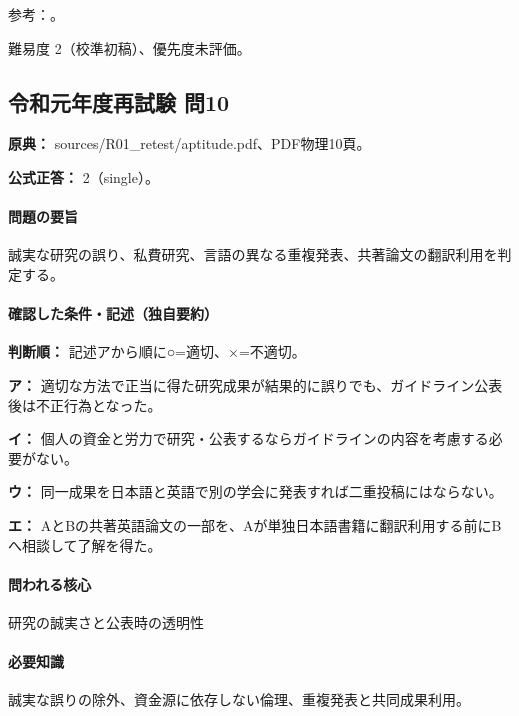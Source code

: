 \par 参考：\cite{jsps_integrity2025}。

\par 難易度 2（校準初稿）、優先度未評価。

\subsection{令和元年度再試験 問10}
\label{q:r01-ret-apt-10}

\noindent\textbf{原典：} sources/R01\_retest/aptitude.pdf、PDF物理10頁。

\textbf{公式正答：} 2（single）。

\paragraph{問題の要旨} 誠実な研究の誤り、私費研究、言語の異なる重複発表、共著論文の翻訳利用を判定する。

\paragraph{確認した条件・記述（独自要約）}\mbox{}\par

\noindent\textbf{判断順：} 記述アから順に○=適切、×=不適切。\par

\noindent\textbf{ア：} 適切な方法で正当に得た研究成果が結果的に誤りでも、ガイドライン公表後は不正行為となった。\par

\noindent\textbf{イ：} 個人の資金と労力で研究・公表するならガイドラインの内容を考慮する必要がない。\par

\noindent\textbf{ウ：} 同一成果を日本語と英語で別の学会に発表すれば二重投稿にはならない。\par

\noindent\textbf{エ：} AとBの共著英語論文の一部を、Aが単独日本語書籍に翻訳利用する前にBへ相談して了解を得た。\par

\paragraph{問われる核心} 研究の誠実さと公表時の透明性

\paragraph{必要知識} 誠実な誤りの除外、資金源に依存しない倫理、重複発表と共同成果利用。

